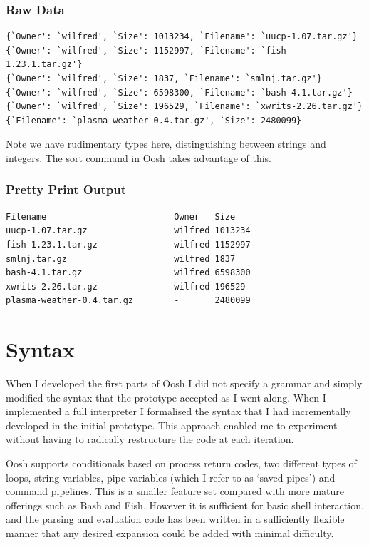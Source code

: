 \documentclass[12pt,twoside,notitlepage]{report}
\begin{document}
\subsubsection{Raw Data}
\label{rawdata}
\begin{verbatim}
{`Owner': `wilfred', `Size': 1013234, `Filename': `uucp-1.07.tar.gz'}
{`Owner': `wilfred', `Size': 1152997, `Filename': `fish-1.23.1.tar.gz'}
{`Owner': `wilfred', `Size': 1837, `Filename': `smlnj.tar.gz'}
{`Owner': `wilfred', `Size': 6598300, `Filename': `bash-4.1.tar.gz'}
{`Owner': `wilfred', `Size': 196529, `Filename': `xwrits-2.26.tar.gz'}
{`Filename': `plasma-weather-0.4.tar.gz', `Size': 2480099}
\end{verbatim}
Note we have rudimentary types here, distinguishing between strings and
integers. The sort command in Oosh takes advantage of this.

\subsubsection{Pretty Print Output}
\begin{verbatim}
Filename                         Owner   Size      
uucp-1.07.tar.gz                 wilfred 1013234   
fish-1.23.1.tar.gz               wilfred 1152997   
smlnj.tar.gz                     wilfred 1837      
bash-4.1.tar.gz                  wilfred 6598300   
xwrits-2.26.tar.gz               wilfred 196529    
plasma-weather-0.4.tar.gz        -       2480099
\end{verbatim}

\section{Syntax}
When I developed the first parts of Oosh I did not specify a grammar and simply
modified the syntax that the prototype accepted as I went along. When I
implemented a full interpreter I formalised the syntax that I had
incrementally developed in the initial prototype. This
approach enabled me to experiment without having to radically restructure the
code at each iteration.

Oosh supports conditionals based on process return codes, two
different types of loops, string variables, pipe variables (which I
refer to as `saved pipes') and command pipelines. This is a smaller
feature set compared with more mature offerings such as Bash and
Fish. However it is sufficient for basic shell interaction, and the
parsing and evaluation code has been written in a sufficiently
flexible manner that any desired expansion could be added with minimal
difficulty.
\end{document}
